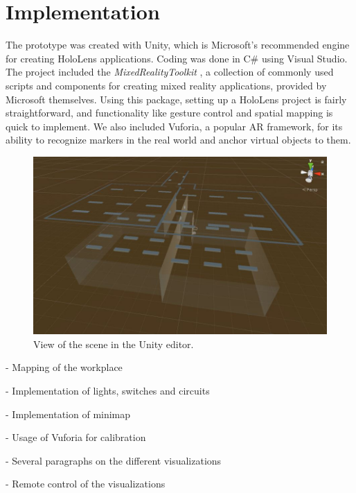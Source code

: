 \chapter{Implementation} \label{chap:impl}
The prototype was created with Unity, which is Microsoft's recommended engine for creating HoloLens applications. Coding was done in C\# using Visual Studio. The project included the \textit{MixedRealityToolkit} \cite{Microsof99:online}, a collection of commonly used scripts and components for creating mixed reality applications, provided by Microsoft themselves. Using this package, setting up a HoloLens project is fairly straightforward, and functionality like gesture control and spatial mapping is quick to implement. We also included Vuforia, a popular AR framework, for its ability to recognize markers in the real world and anchor virtual objects to them.



\begin{figure}
    \centering
    \includegraphics[width=1.0\linewidth]{resources/implementation/model.jpg}
    \caption{View of the scene in the Unity editor.}
    \label{fig:model}
\end{figure}

- Mapping of the workplace

- Implementation of lights, switches and circuits

- Implementation of minimap

- Usage of Vuforia for calibration

- Several paragraphs on the different visualizations

- Remote control of the visualizations
